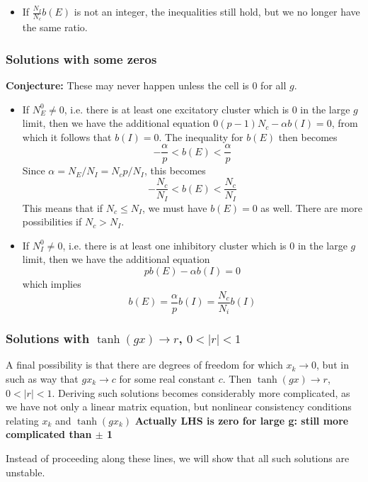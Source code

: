 \documentclass[11pt,reqno]{amsart}
\begin{document}
\begin{itemize}
\item If $\frac{N_I}{N_c} b(E)$ is not an integer, the inequalities still hold, but we no longer have the same ratio.

\end{itemize}

\subsubsection{Solutions with some zeros}

\textbf{Conjecture:} These may never happen unless the cell is 0 for all $g$.

\begin{itemize}
\item If $N_E^0 \neq 0$, i.e. there is at least one excitatory cluster which is 0 in the large $g$ limit, then we have the additional equation $0(p-1)N_c - \alpha b(I) = 0$, from which it follows that $b(I) = 0$. The inequality for $b(E)$ then becomes
\[
-\frac{\alpha}{p} < b(E) < \frac{\alpha}{p}
\]
Since $\alpha = N_E/N_I = N_c p/N_I$, this becomes
\[
-\frac{N_c}{N_I} < b(E) < \frac{N_c}{N_I}
\]
This means that if $N_c \leq N_I$, we must have $b(E) = 0$ as well. There are more possibilities if $N_c > N_I$.

\item If $N_I^0 \neq 0$, i.e. there is at least one inhibitory cluster which is 0 in the large $g$ limit, then we have the additional equation 
\[
p b(E) - \alpha b(I) = 0
\]
which implies
\[
b(E) = \frac{\alpha}{p} b(I) = \frac{N_c}{N_i} b(I)
\]

\end{itemize}

\subsubsection{Solutions with $\tanh(gx) \rightarrow r$, $0 < \vert r \vert < 1$}

A final possibility is that there are degrees of freedom for which $x_k \rightarrow 0$, but in such as way that $g x_k \rightarrow c$ for some real constant $c$. Then $\tanh(gx) \rightarrow r$, $0 < \vert r \vert < 1$. Deriving such solutions becomes considerably more complicated, as we have not only a linear matrix equation, but nonlinear consistency conditions relating $x_k$ and $\tanh(g x_k)$ \textbf{Actually LHS is zero for large g: still more complicated than $\pm$ 1}

Instead of proceeding along these lines, we will show that all such solutions are unstable.
\end{document}
